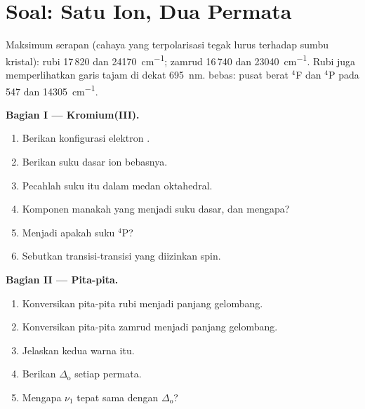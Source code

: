 \section{Soal: Satu Ion, Dua Permata}

\begin{problem}
\label{pb:b3:complex-spectra-magnetism:1}
Maksimum serapan (cahaya yang terpolarisasi tegak lurus terhadap sumbu kristal): rubi
17\,820 dan \qty{24170}{cm^{-1}}; zamrud 16\,740 dan \qty{23040}{cm^{-1}}. Rubi juga memperlihatkan garis
tajam di dekat \qty{695}{nm}.  bebas: pusat berat $^4$F dan $^4$P pada 547 dan \qty{14305}{cm^{-1}}.

\medskip\noindent\textbf{Bagian I --- Kromium(III).}
\begin{enumerate}[beginpenalty=10000]
  \item Berikan konfigurasi elektron .
  \item Berikan suku dasar ion bebasnya.
  \item Pecahlah suku itu dalam medan oktahedral.
  \item Komponen manakah yang menjadi suku dasar, dan mengapa?
  \item Menjadi apakah suku $^4$P?
  \item Sebutkan transisi-transisi yang diizinkan spin.
\end{enumerate}

\medskip\noindent\textbf{Bagian II --- Pita-pita.}
\begin{enumerate}[resume, beginpenalty=10000]
  \item Konversikan pita-pita rubi menjadi panjang gelombang.
  \item Konversikan pita-pita zamrud menjadi panjang gelombang.
  \item Jelaskan kedua warna itu.
  \item Berikan $\Delta_{\mathrm o}$ setiap permata.
  \item Mengapa $\nu_1$ tepat sama dengan $\Delta_{\mathrm o}$?
\end{enumerate}


\end{problem}
